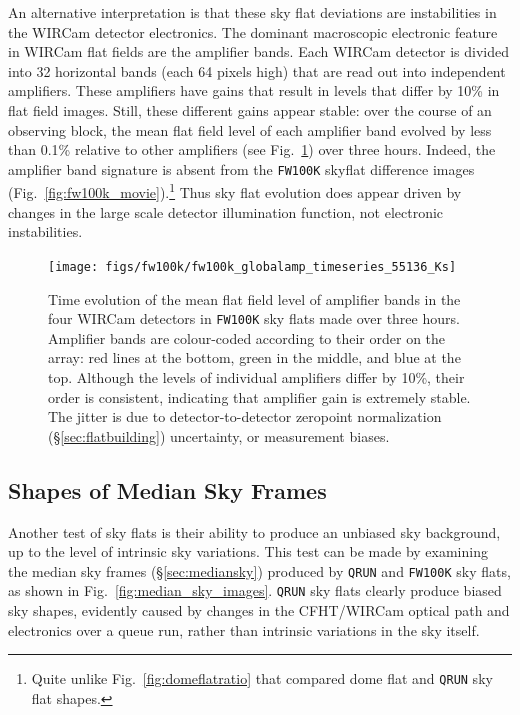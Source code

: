 \documentclass[iop]{emulateapj}
\newcommand{\Fig}[1]{Fig.~\ref{fig:#1}}  %
\newcommand{\Sec}[1]{\S\ref{sec:#1}}  %
\begin{document}
An alternative interpretation is that these sky flat deviations are instabilities in the WIRCam detector electronics.
The dominant macroscopic electronic feature in WIRCam flat fields are the amplifier bands.
Each WIRCam detector is divided into 32 horizontal bands (each 64 pixels high) that are read out into independent amplifiers.
These amplifiers have gains that result in levels that differ by 10\% in flat field images.
Still, these different gains appear stable: over the course of an observing block, the mean flat field level of each amplifier band evolved by less than 0.1\% relative to other amplifiers (see \Fig{fw100k_globalamp_timeseries_55136_Ks}) over three hours.
Indeed, the amplifier band signature is absent from the \texttt{FW100K} skyflat difference images (\Fig{fw100k_movie}).\footnote{Quite unlike \Fig{domeflatratio} that compared dome flat and \texttt{QRUN} sky flat shapes.}
Thus sky flat evolution does appear driven by changes in the large scale detector illumination function, not electronic instabilities.

\begin{figure}[t]
\centering
\texttt{[image: figs/fw100k/fw100k\_globalamp\_timeseries\_55136\_Ks]}
\caption{Time evolution of the mean flat field level of amplifier bands in the four WIRCam detectors in \texttt{FW100K} sky flats made over three hours.
Amplifier bands are colour-coded according to their order on the array: red lines at the bottom, green in the middle, and blue at the top.
Although the levels of individual amplifiers differ by 10\%, their order is consistent, indicating that amplifier gain is extremely stable.
The jitter is due to detector-to-detector zeropoint normalization (\Sec{flatbuilding}) uncertainty, or measurement biases.}
\label{fig:fw100k_globalamp_timeseries_55136_Ks}
\end{figure}

\subsection{Shapes of Median Sky Frames}
\label{sec:medianskyshapes}

Another test of sky flats is their ability to produce an unbiased sky background, up to the level of intrinsic sky variations.
This test can be made by examining the median sky frames (\Sec{mediansky}) produced by \texttt{QRUN} and \texttt{FW100K} sky flats, as shown in \Fig{median_sky_images}.
\texttt{QRUN} sky flats clearly produce biased sky shapes, evidently caused by changes in the CFHT/WIRCam optical path and electronics over a queue run, rather than intrinsic variations in the sky itself.
\end{document}
